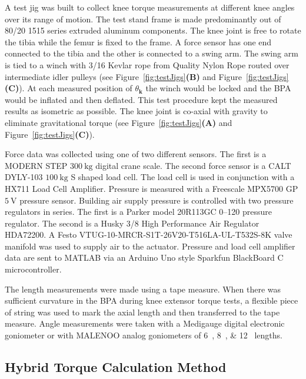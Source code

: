 A test jig was built to collect knee torque measurements at different knee angles over its range of motion. The test stand frame is made predominantly out of 80/20 1515 series extruded aluminum components. The knee joint is free to rotate the tibia while the femur is fixed to the frame. A force sensor has one end connected to the tibia and the other is connected to a swing arm. The swing arm is tied to a winch with \qty[parse-numbers=false]{3/16}{\inch} Kevlar rope from Quality Nylon Rope routed over intermediate idler pulleys (see Figure~\ref{fig:testJigs}\textbf{(B)} and Figure~\ref{fig:testJigs}\textbf{(C)}). At each measured position of $\theta_{\mathbf{k}}$ the winch would be locked and the BPA would be inflated and then deflated. This test procedure kept the measured results as isometric as possible.  The knee joint is co-axial with gravity to eliminate gravitational torque (see Figure~\ref{fig:testJigs}\textbf{(A)} and Figure~\ref{fig:testJigs}\textbf{(C)}).

Force data was collected using one of two different sensors. The first is a MODERN STEP $\qty{300}{\kilo\gram}$ digital crane scale. The second force sensor is a CALT DYLY-103 $\qty{100}{\kilo\gram}$ S shaped load cell. The load cell is used in conjunction with a HX711 Load Cell Amplifier. Pressure is measured with a Freescale MPX5700 GP $\qty{5}{\volt}$ pressure sensor. Building air supply pressure is controlled with two pressure regulators in series. The first is a Parker model 20R113GC \qtyrange{0}{120}{\pressurepsi} pressure regulator. The second is a Husky \qty[parse-numbers=false]{3/8}{\inch} High Performance Air Regulator HDA72200. A Festo VTUG-10-MRCR-S1T-26V20-T516LA-UL-T532S-8K valve manifold was used to supply air to the actuator. Pressure and load cell amplifier data are sent to MATLAB via an Arduino Uno style Sparkfun BlackBoard C microcontroller.


The length measurements were made using a tape measure. When there was sufficient curvature in the BPA during knee extensor torque tests, a flexible piece of string was used to mark the axial length and then transferred to the tape measure. Angle measurements were taken with a Medigauge digital electronic goniometer or with MALENOO analog goniometers of \qtylist{6;8;12}{\inch} lengths.

\subsection{Hybrid Torque Calculation Method}\label{sec:hybrid_method}


